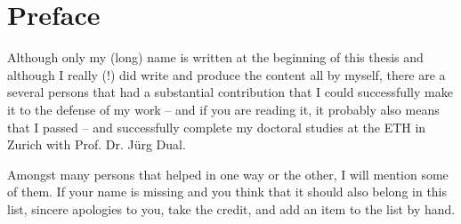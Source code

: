 \chapter*{Preface}

Although only my (long) name is written at the beginning of this thesis and 
although I really (!) did write and produce the content all by myself, there 
are a several persons that had a substantial contribution that I could 
successfully make it to the defense of my work -- and if you are reading it, it 
probably also means that I passed -- and successfully complete my doctoral 
studies at the ETH in Zurich with Prof. Dr. Jürg Dual.

Amongst many persons that helped in one way or the other, I will mention some 
of them. If your name is missing and you think that it should also belong in 
this list, sincere apologies to you, take the credit, and add an item to the 
list by hand.

